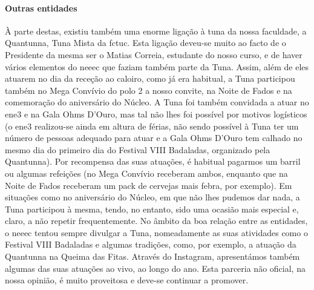 \paragraph{Outras entidades}

À parte destas, existiu também uma enorme ligação à tuna da nossa faculdade, a Quantunna, Tuna Mista da \acrshort{fctuc}. Esta ligação deveu-se muito ao facto de o Presidente da mesma ser o Matias Correia, estudante do nosso curso, e de haver vários elementos do \acrshort{neeec} que faziam também parte da Tuna. Assim, além de eles atuarem no dia da receção ao caloiro, como já era habitual, a Tuna participou também no Mega Convívio do polo 2 a nosso convite, na Noite de Fados e na comemoração do aniversário do Núcleo. A Tuna foi também convidada a atuar no \acrshort{ene3} e na Gala Ohms D'Ouro, mas tal não lhes foi possível por motivos logísticos (o \acrshort{ene3} realizou-se ainda em altura de férias, não sendo possível à Tuna ter um número de pessoas adequado para atuar e a Gala Ohms D'Ouro tem calhado no mesmo dia do primeiro dia do Festival VIII Badaladas, organizado pela Quantunna). Por recompensa das suas atuações, é habitual pagarmos um barril ou algumas refeições (no Mega Convívio receberam ambos, enquanto que na Noite de Fados receberam um pack de cervejas mais febra, por exemplo). Em situações como no aniversário do Núcleo, em que não lhes pudemos dar nada, a Tuna participou à mesma, tendo, no entanto, sido uma ocasião mais especial e, claro, a não repetir frequentemente. No âmbito da boa relação entre as entidades, o \acrshort{neeec} tentou sempre divulgar a Tuna, nomeadamente as suas atividades como o Festival VIII Badaladas e algumas tradições, como, por exemplo, a atuação da Quantunna na Queima das Fitas. Através do Instagram, apresentámos também algumas das suas atuações ao vivo, ao longo do ano. Esta parceria não oficial, na nossa opinião, é muito proveitosa e deve-se continuar a promover.